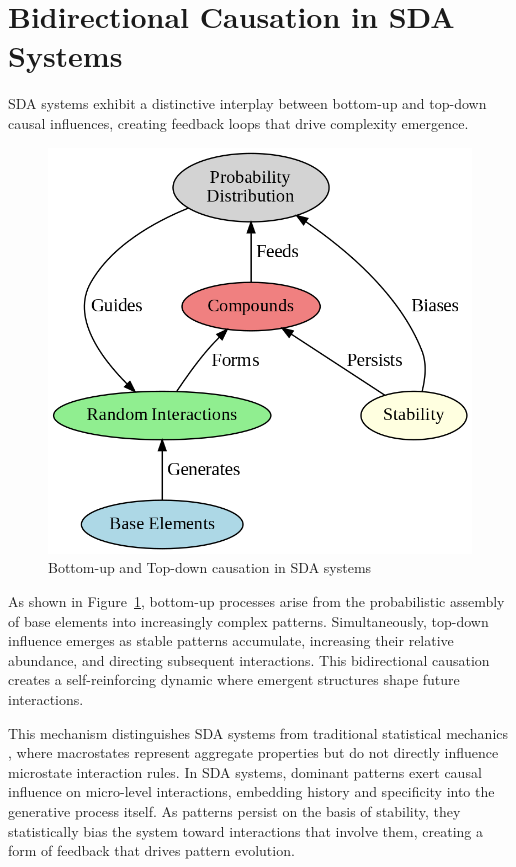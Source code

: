 \documentclass[preprint,12pt]{elsarticle}
\begin{document}
\section{Bidirectional Causation in SDA Systems}

SDA systems exhibit a distinctive interplay between bottom-up and top-down causal influences, creating feedback loops that drive complexity emergence.

\begin{figure}[h]
    \centering
    \includegraphics[width=0.7\linewidth,height=0.7\linewidth]{figure_10.png}
    \caption{Bottom-up and Top-down causation in SDA systems}
    \label{fig:figure_10}
\end{figure}

As shown in Figure~\ref{fig:figure_10}, bottom-up processes arise from the probabilistic assembly of base elements into increasingly complex patterns. Simultaneously, top-down influence emerges as stable patterns accumulate, increasing their relative abundance, and directing subsequent interactions. This bidirectional causation creates a self-reinforcing dynamic where emergent structures shape future interactions.

This mechanism distinguishes SDA systems from traditional statistical mechanics \cite{landau1980statistical}, where macrostates represent aggregate properties but do not directly influence microstate interaction rules. In SDA systems, dominant patterns exert causal influence on micro-level interactions, embedding history and specificity into the generative process itself. As patterns persist on the basis of stability, they statistically bias the system toward interactions that involve them, creating a form of feedback that drives pattern evolution.
\end{document}
